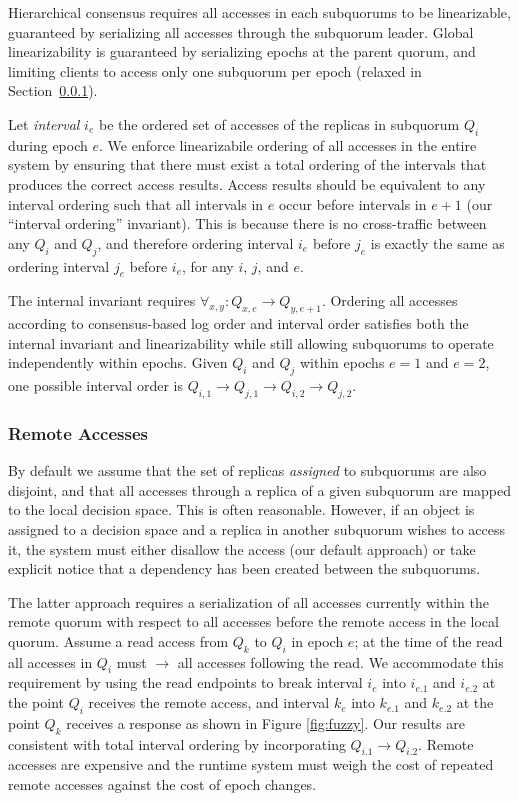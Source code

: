 \documentclass[11pt,letterpaper]{article}
\begin{document}
Hierarchical consensus requires all accesses in each subquorums to be linearizable,
guaranteed by serializing all accesses through the subquorum leader.
Global linearizability is guaranteed by serializing epochs at the parent
quorum, and limiting clients to access only one subquorum per epoch (relaxed
in Section~\ref{sec:remote}).

Let \emph{interval} $i_e$ be the ordered set of accesses of the replicas in subquorum
$Q_i$ during epoch $e$.
We enforce linearizabile ordering of all accesses in the entire system by
ensuring that there must exist a total ordering of the intervals that produces the correct
access results.
Access results should be equivalent to any interval ordering
such that all intervals in $e$ occur before intervals in $e+1$ (our ``interval
ordering'' invariant).
This is because there is no cross-traffic between any $Q_i$ and $Q_j$, and therefore
ordering interval $i_e$ before $j_e$ is exactly the same as ordering interval $j_e$
before $i_e$, for any $i$, $j$, and $e$.

The internal invariant requires $\forall_{x,y} : Q_{x,e} \rightarrow Q_{y,e+1}$.
Ordering all accesses according to consensus-based log order and interval order satisfies both the
internal invariant and linearizability  while still allowing subquorums to operate
independently within epochs.
Given $Q_i$ and $Q_j$ within epochs $e=1$ and $e=2$, one possible interval order is
$Q_{i,1} \rightarrow Q_{j,1} \rightarrow Q_{i,2} \rightarrow Q_{j,2}$.

\subsubsection{Remote Accesses}
\label{sec:remote}
\vspace{-.5em}

By default we assume that the set of replicas \emph{assigned} to subquorums are also
disjoint, and that all accesses through a replica of a given subquorum are mapped to the
local decision space.
This is often reasonable.
However, if an object is assigned to a decision space and a replica in another subquorum
wishes to
access it, the system must either disallow the access (our default approach) or take
explicit notice that a dependency has been created between the subquorums.

The latter approach requires a serialization of all accesses currently within the remote
quorum with respect to all accesses before the remote access in the local quorum.
Assume a read access from $Q_k$ to $Q_i$ in epoch $e$; at the time of the read all
accesses in $Q_i$ must $\rightarrow$ all accesses following the read.
We accommodate this requirement by using the read endpoints to break interval $i_e$ into
$i_{e.1}$ and $i_{e.2}$ at the point $Q_i$ receives the remote access, and interval $k_e$
into $k_{e.1}$ and $k_{e.2}$ at the point $Q_k$ receives a response as shown in
Figure \ref{fig:fuzzy}.
Our results are consistent with total interval ordering by incorporating $Q_{i.1}
\rightarrow Q_{i.2}$.
Remote accesses are expensive and the runtime system must weigh the cost of repeated
remote accesses against the cost of epoch changes.
\end{document}
